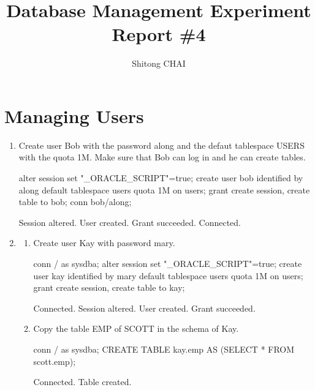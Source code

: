 \documentclass{article}
\title{Database Management Experiment Report \#4}
\author{Shitong CHAI}
\date{\vspace{-5ex}}
\begin{document}
\maketitle



\section{Managing Users}
\begin{enumerate}

\item{Create user Bob with the password along and the defaut tablespace USERS with the quota 1M. Make sure that Bob can log in and he can create tables.}
\begin{sqlshell}
alter session set "_ORACLE_SCRIPT"=true;
create user bob identified by along default tablespace users quota 1M on users;
grant create session, create table to bob;
conn bob/along;
\end{sqlshell}

\begin{messageshell}
Session altered.
User created.
Grant succeeded.
Connected.

\end{messageshell}

\item{ }
 \begin{enumerate}
 \item{Create user Kay with password mary. }
\begin{sqlshell}
conn / as sysdba;
alter session set "_ORACLE_SCRIPT"=true;
create user kay identified by mary default tablespace users quota 1M on users;
grant create session, create table to kay;
\end{sqlshell}
\begin{messageshell}
Connected.
Session altered.
User created.
Grant succeeded.

\end{messageshell}

 \item{Copy the table EMP of SCOTT in the schema of Kay.}
\begin{sqlshell}
conn / as sysdba;
CREATE TABLE kay.emp AS (SELECT * FROM scott.emp);
\end{sqlshell}
\begin{messageshell}
Connected.
Table created.
\end{messageshell}
 \end{enumerate}


\end{enumerate}
\end{document}
